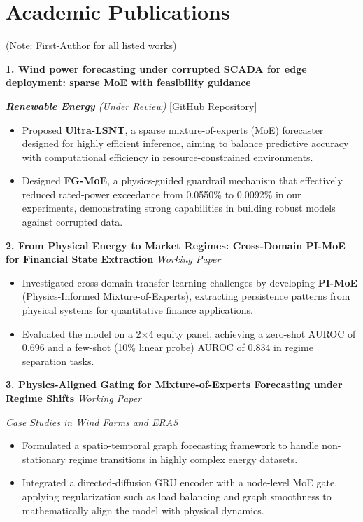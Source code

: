 \documentclass[10pt,a4paper]{article}
\begin{document}
\section{Academic Publications}
{\small (Note: First-Author for all listed works)}
\vspace{3pt}

{\small
\textbf{1. Wind power forecasting under corrupted SCADA for edge deployment: sparse MoE with feasibility guidance}

\textit{\textbf{Renewable Energy} (Under Review)} \hfill \href{https://github.com/b1ue13e}{\underline{[GitHub Repository]}}
\begin{itemize}
    \item Proposed \textbf{Ultra-LSNT}, a sparse mixture-of-experts (MoE) forecaster designed for highly efficient inference, aiming to balance predictive accuracy with computational efficiency in resource-constrained environments.
    \item Designed \textbf{FG-MoE}, a physics-guided guardrail mechanism that effectively reduced rated-power exceedance from 0.0550\% to 0.0092\% in our experiments, demonstrating strong capabilities in building robust models against corrupted data.
\end{itemize}

\vspace{4pt}

\textbf{2. From Physical Energy to Market Regimes: Cross-Domain PI-MoE for Financial State Extraction} \hfill \textit{Working Paper}
\begin{itemize}
    \item Investigated cross-domain transfer learning challenges by developing \textbf{PI-MoE} (Physics-Informed Mixture-of-Experts), extracting persistence patterns from physical systems for quantitative finance applications.
    \item Evaluated the model on a 2$\times$4 equity panel, achieving a zero-shot AUROC of 0.696 and a few-shot (10\% linear probe) AUROC of 0.834 in regime separation tasks.
\end{itemize}

\vspace{4pt}

\textbf{3. Physics-Aligned Gating for Mixture-of-Experts Forecasting under Regime Shifts} \hfill \textit{Working Paper}

\textit{Case Studies in Wind Farms and ERA5}
\begin{itemize}
    \item Formulated a spatio-temporal graph forecasting framework to handle non-stationary regime transitions in highly complex energy datasets.
    \item Integrated a directed-diffusion GRU encoder with a node-level MoE gate, applying regularization such as load balancing and graph smoothness to mathematically align the model with physical dynamics.
\end{itemize}
}
\end{document}
